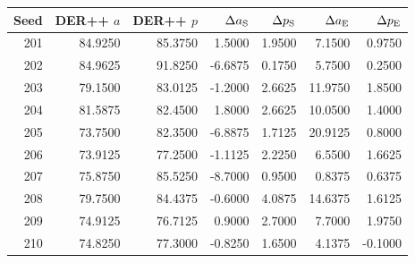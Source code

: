 \begin{tabular}{rrrrrrr}
\toprule
Seed & DER++ $a$ & DER++ $p$ & $\Delta a_{\rm S}$ & $\Delta p_{\rm S}$ & $\Delta a_{\rm E}$ & $\Delta p_{\rm E}$ \\
\midrule
201 & 84.9250 & 85.3750 & 1.5000 & 1.9500 & 7.1500 & 0.9750 \\
202 & 84.9625 & 91.8250 & -6.6875 & 0.1750 & 5.7500 & 0.2500 \\
203 & 79.1500 & 83.0125 & -1.2000 & 2.6625 & 11.9750 & 1.8500 \\
204 & 81.5875 & 82.4500 & 1.8000 & 2.6625 & 10.0500 & 1.4000 \\
205 & 73.7500 & 82.3500 & -6.8875 & 1.7125 & 20.9125 & 0.8000 \\
206 & 73.9125 & 77.2500 & -1.1125 & 2.2250 & 6.5500 & 1.6625 \\
207 & 75.8750 & 85.5250 & -8.7000 & 0.9500 & 0.8375 & 0.6375 \\
208 & 79.7500 & 84.4375 & -0.6000 & 4.0875 & 14.6375 & 1.6125 \\
209 & 74.9125 & 76.7125 & 0.9000 & 2.7000 & 7.7000 & 1.9750 \\
210 & 74.8250 & 77.3000 & -0.8250 & 1.6500 & 4.1375 & -0.1000 \\
\bottomrule
\end{tabular}
